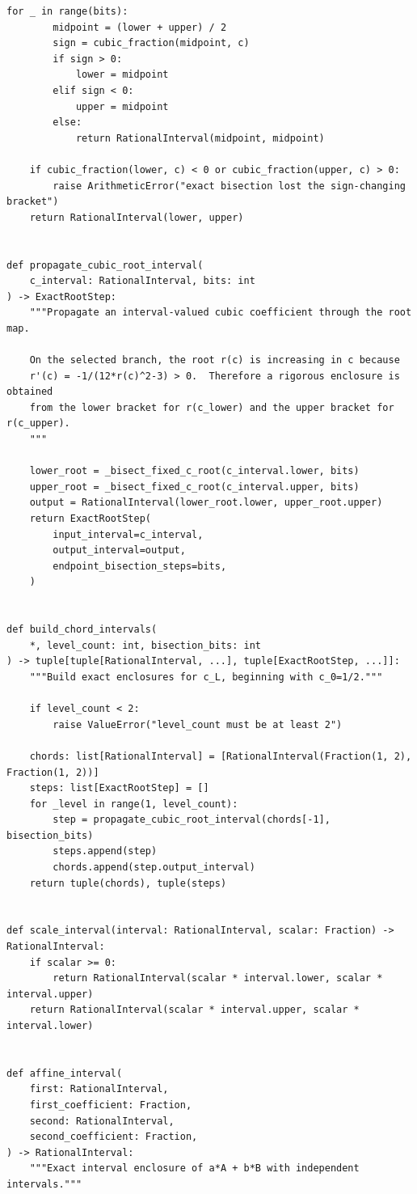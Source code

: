 \documentclass[11pt]{article}
\begin{document}
\begin{lstlisting}[style=pythonstyle,caption={Exact certification lane: \texttt{certified\_richardson.py}}]
    for _ in range(bits):
        midpoint = (lower + upper) / 2
        sign = cubic_fraction(midpoint, c)
        if sign > 0:
            lower = midpoint
        elif sign < 0:
            upper = midpoint
        else:
            return RationalInterval(midpoint, midpoint)

    if cubic_fraction(lower, c) < 0 or cubic_fraction(upper, c) > 0:
        raise ArithmeticError("exact bisection lost the sign-changing bracket")
    return RationalInterval(lower, upper)


def propagate_cubic_root_interval(
    c_interval: RationalInterval, bits: int
) -> ExactRootStep:
    """Propagate an interval-valued cubic coefficient through the root map.

    On the selected branch, the root r(c) is increasing in c because
    r'(c) = -1/(12*r(c)^2-3) > 0.  Therefore a rigorous enclosure is obtained
    from the lower bracket for r(c_lower) and the upper bracket for r(c_upper).
    """

    lower_root = _bisect_fixed_c_root(c_interval.lower, bits)
    upper_root = _bisect_fixed_c_root(c_interval.upper, bits)
    output = RationalInterval(lower_root.lower, upper_root.upper)
    return ExactRootStep(
        input_interval=c_interval,
        output_interval=output,
        endpoint_bisection_steps=bits,
    )


def build_chord_intervals(
    *, level_count: int, bisection_bits: int
) -> tuple[tuple[RationalInterval, ...], tuple[ExactRootStep, ...]]:
    """Build exact enclosures for c_L, beginning with c_0=1/2."""

    if level_count < 2:
        raise ValueError("level_count must be at least 2")

    chords: list[RationalInterval] = [RationalInterval(Fraction(1, 2), Fraction(1, 2))]
    steps: list[ExactRootStep] = []
    for _level in range(1, level_count):
        step = propagate_cubic_root_interval(chords[-1], bisection_bits)
        steps.append(step)
        chords.append(step.output_interval)
    return tuple(chords), tuple(steps)


def scale_interval(interval: RationalInterval, scalar: Fraction) -> RationalInterval:
    if scalar >= 0:
        return RationalInterval(scalar * interval.lower, scalar * interval.upper)
    return RationalInterval(scalar * interval.upper, scalar * interval.lower)


def affine_interval(
    first: RationalInterval,
    first_coefficient: Fraction,
    second: RationalInterval,
    second_coefficient: Fraction,
) -> RationalInterval:
    """Exact interval enclosure of a*A + b*B with independent intervals."""


\end{lstlisting}
\end{document}
